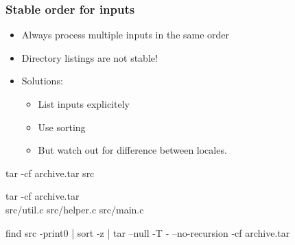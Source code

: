 \documentclass[14pt,aspectratio=169]{beamer}
\begin{document}
\begin{frame}[fragile]
 \frametitle{Stable order for inputs}

 \begin{itemize}
  \item Always process multiple inputs in the same order
  \item Directory listings are not stable!
  \item<2-> Solutions:
   \begin{itemize}
    \item List inputs explicitely
    \item<3-> Use sorting
    \item<4> \alert{But watch out for difference between locales.}
   \end{itemize}
 \end{itemize}

 \begin{example}
  \begin{overprint}
\begin{semiverbatim}
tar -cf archive.tar src
\end{semiverbatim}
\begin{semiverbatim}
tar -cf archive.tar \\
  src/util.c src/helper.c src/main.c
\end{semiverbatim}
\begin{semiverbatim}
find src -print0 | sort -z |
  tar --null -T - --no-recursion -cf archive.tar
\end{semiverbatim}
  \end{overprint}
 \end{example}
\end{frame}

\begin{frame}[plain]
\end{frame}
\end{document}
